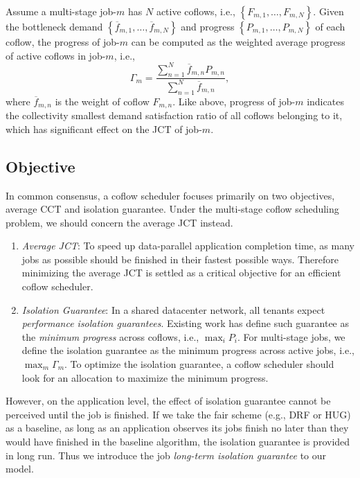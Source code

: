 \documentclass[10pt, conference, letterpaper]{IEEEtran}
\begin{document}
Assume a multi-stage job-$m$ has $N$ active coflows, i.e., $\left\{F_{m,1},\dots,F_{m,N}\right\}$. Given the bottleneck demand $\left\{\overline{f}_{m,1},\dots,\overline{f}_{m,N}\right\}$ and progress $\left\{P_{m,1},\dots,P_{m,N}\right\}$ of each coflow, the progress of job-$m$ can be computed as the weighted average progress of active coflows in job-$m$, i.e.,
\begin{equation}
	\Gamma_m = \frac{\sum_{n=1}^N \overline{f}_{m,n}P_{m,n}}{\sum_{n=1}^N \overline{f}_{m,n}},
\end{equation}
where $\overline{f}_{m,n}$ is the weight of coflow $F_{m,n}$. Like above, progress of job-$m$ indicates the collectivity smallest demand satisfaction ratio of all coflows belonging to it, which has significant effect on the JCT of job-$m$.

\subsection{Objective}
In common consensus\cite{coflow, coflex, utopia}, a coflow scheduler focuses primarily on two objectives, average CCT and isolation guarantee. Under the multi-stage coflow  scheduling problem, we should concern the average JCT instead.

\begin{enumerate}
	\item \emph{Average JCT}: To speed up data-parallel application completion time, as many jobs as possible should be finished in their fastest possible ways. Therefore minimizing the average JCT is settled as a critical objective for an efficient coflow scheduler.
	\item \emph{Isolation Guarantee}: In a shared datacenter network, all tenants expect \emph{performance isolation guarantees}. Existing work has define such guarantee as the \emph{minimum progress} across coflows\cite{HUG}, i.e., $\max_i P_i$. For multi-stage jobs, we define the isolation guarantee as the minimum progress across active jobs, i.e., $\max_m \Gamma_m$. To optimize the isolation guarantee, a coflow scheduler should look for an allocation to maximize the minimum progress.
\end{enumerate}

However, on the application level, the effect of isolation guarantee cannot be perceived until the job is finished. If we take the fair scheme (e.g., DRF\cite{DRF} or HUG\cite{HUG}) as a baseline, as long as an application observes its jobs finish no later than they would have finished in the baseline algorithm, the isolation guarantee is provided in long run. Thus we introduce the job \emph{long-term isolation guarantee} to our model.
\end{document}
